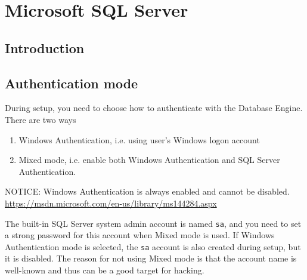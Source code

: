 \chapter{Microsoft SQL Server}
\label{chap:SQL_Server}

\section{Introduction}


\section{Authentication mode}
\label{sec:SQLServer_authentication_mode}

During setup, you need to choose how to authenticate with the Database Engine. There are two ways
\begin{enumerate}
  \item Windows Authentication, i.e. using user's Windows logon account
  
  \item Mixed mode, i.e. enable both Windows Authentication and SQL Server Authentication.
\end{enumerate}
NOTICE: Windows Authentication is always enabled and cannot be disabled.
\url{https://msdn.microsoft.com/en-us/library/ms144284.aspx}

The built-in SQL Server system admin account is named \verb!sa!, and you need to set a strong password for 
this account when Mixed mode is used. If Windows Authentication mode is selected,
the \verb!sa! account is also created during setup, but it is disabled. The reason for not using Mixed mode
is that the account name is well-known and thus can be a good target for hacking.

